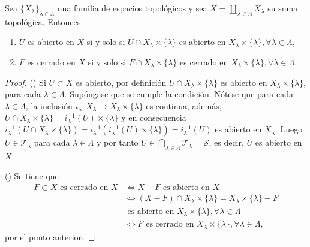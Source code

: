 
\begin{theorem}
Sea $\{ X_{\lambda} \}_{\lambda \in \Lambda}$ una familia de espacios topológicos y sea $X = \coprod_{\lambda \in \Lambda} X_{\lambda}$ su suma topológica. Entonces
\begin{enumerate}[label=\textnormal{(\roman*)}]
\item $U$ es abierto en $X$ si y solo si $U \cap X_{\lambda} \times \{ \lambda \}$ es abierto en $X_{\lambda} \times \{ \lambda \},\forall \lambda \in \Lambda$,
\item $F$ es cerrado en $X$ si y solo si $F \cap X_{\lambda} \times \{ \lambda \}$ es cerrado en $X_{\lambda} \times \{ \lambda \},\forall \lambda \in \Lambda$.
\end{enumerate}
\end{theorem}

\begin{proof}
({}) Si $U \subset X$ es abierto, por definición $U \cap X_{\lambda} \times \{ \lambda \}$ es abierto en $X_{\lambda} \times \{ \lambda \}$, para cada $\lambda \in \Lambda$. Supóngase que se cumple la condición. Nótese que para cada $\lambda \in \Lambda$, la inclusión $i_{\lambda} : X_{\lambda} \longrightarrow X_{\lambda} \times \{ \lambda \}$ es continua, además, $U \cap X_{\lambda} \times \{ \lambda \} = i^{-1}_{\lambda}(U) \times \{ \lambda \}$ y en consecuencia $i^{-1}_{\lambda}(U \cap X_{\lambda }\times \{ \lambda \}) = i^{-1}_{\lambda}(i^{-1}_{\lambda}(U) \times \{ \lambda \}) = i^{-1}_{\lambda}(U)$ es abierto en $X_{\lambda}$. Luego $U \in \mathcal{T}_{\lambda}$ para cada $\lambda \in \Lambda$ y por tanto $U \in \bigcap_{\lambda \in \Lambda} \mathcal{T}_{\lambda} = \mathcal{S}$, es decir, $U$ es abierto en $X$.
\bigskip

({}) Se tiene que
\begin{align*}
    F \subset X \text{ es cerrado en } X & \iff X - F \text{ es abierto en } X \\
                                           & \iff (X - F) \cap X_{\lambda} \times \{ \lambda \} = X_{\lambda} \times \{ \lambda \} - F \\
                                           & \text{ es abierto en } X_{\lambda} \times \{ \lambda \}, \forall \lambda \in \Lambda \\
                                           & \iff F \text{ es cerrado en } X_{\lambda} \times \{ \lambda \}, \forall \lambda \in \Lambda,
\end{align*}
por el punto anterior.
\end{proof}

